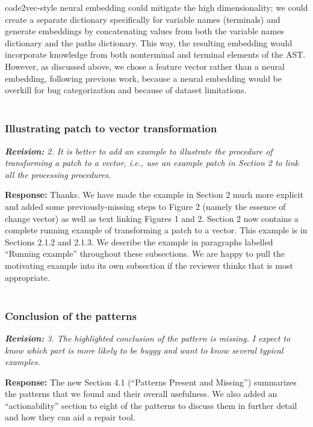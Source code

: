 \documentclass{article}
\begin{document}
code2vec-style neural embedding could mitigate the high dimensionality; we could create a separate dictionary specifically for variable names (terminals) and generate embeddings by concatenating values from both the variable names dictionary and the paths dictionary. This way, the resulting embedding would incorporate knowledge from both nonterminal and terminal elements of the AST. However, as discussed above, we chose a feature vector rather than a neural embedding, following previous work, because a neural embedding would be overkill for bug categorization and because of dataset limitations. \\ \\

\subsubsection{Illustrating patch to vector transformation}

\textit{\textbf{Revision:} 2. It is better to add an example to illustrate the procedure of transforming a patch to a vector, i.e., use an example patch in Section 2 to link all the processing procedures.}

\textbf{Response:} Thanks. We have made the example in Section 2 much more explicit and added some previously-missing steps to Figure 2 (namely the essence of change vector) as well as text linking Figures 1 and 2. Section 2 now contains a complete running example of transforming a patch to a vector. This example is in Sections 2.1.2 and 2.1.3. We describe the example in paragraphs labelled “Running example” throughout these subsections. We are happy to pull the motivating example into its own subsection if the reviewer thinks that is most appropriate. \\ \\

\subsubsection{Conclusion of the patterns}

\textit{\textbf{Revision:} 3. The highlighted conclusion of the pattern is missing. I expect to know which part is more likely to be buggy and want to know several typical examples.}

\textbf{Response:} The new Section 4.1 (``Patterns Present and Missing'') summarizes the patterns that we found and their overall usefulness. We also added an “actionability” section to eight of the patterns to discuss them in further detail and how they can aid a repair tool. \\ \\
\end{document}
